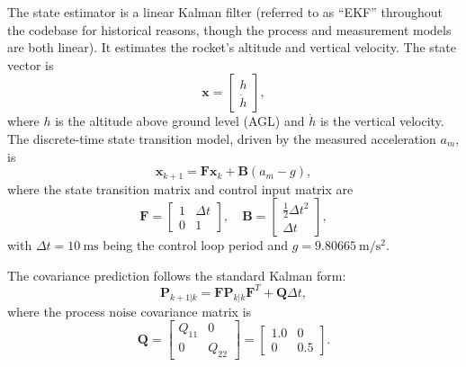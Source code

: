 \documentclass[11pt,letterpaper]{article}
\begin{document}
The state estimator is a linear Kalman filter (referred to as ``EKF'' throughout the codebase for historical reasons, though the process and measurement models are both linear). It estimates the rocket's altitude and vertical velocity. The state vector is
\begin{equation}
    \mathbf{x} = \begin{bmatrix} h \\ \dot{h} \end{bmatrix},
    \label{eq:ekf_state}
\end{equation}
where $h$ is the altitude above ground level (AGL) and $\dot{h}$ is the vertical velocity. The discrete-time state transition model, driven by the measured acceleration $a_m$, is
\begin{equation}
    \mathbf{x}_{k+1} = \mathbf{F} \mathbf{x}_k + \mathbf{B} (a_m - g),
    \label{eq:ekf_predict}
\end{equation}
where the state transition matrix and control input matrix are
\begin{equation}
    \mathbf{F} = \begin{bmatrix} 1 & \Delta t \\ 0 & 1 \end{bmatrix}, \quad
    \mathbf{B} = \begin{bmatrix} \frac{1}{2}\Delta t^2 \\ \Delta t \end{bmatrix},
    \label{eq:ekf_matrices}
\end{equation}
with $\Delta t = \SI{10}{\milli\second}$ being the control loop period and $g = \SI{9.80665}{\metre\per\second\squared}$.

The covariance prediction follows the standard Kalman form:
\begin{equation}
    \mathbf{P}_{k+1|k} = \mathbf{F} \mathbf{P}_{k|k} \mathbf{F}^T + \mathbf{Q} \Delta t,
    \label{eq:ekf_cov_predict}
\end{equation}
where the process noise covariance matrix is
\begin{equation}
    \mathbf{Q} = \begin{bmatrix} Q_{11} & 0 \\ 0 & Q_{22} \end{bmatrix} = \begin{bmatrix} 1.0 & 0 \\ 0 & 0.5 \end{bmatrix}.
    \label{eq:Q_matrix}
\end{equation}
\end{document}
